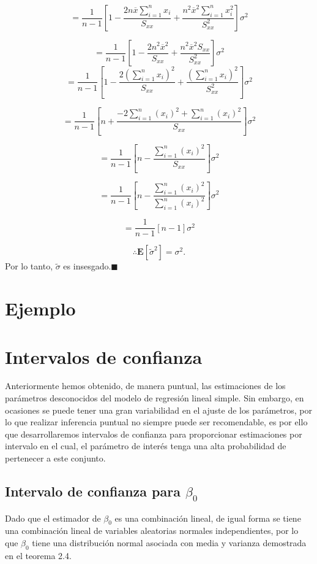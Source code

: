 \documentclass[a4paper,oneside,openany]{book}
\begin{document}
\[=\frac{1}{n-1}\left[ 1-\frac{2n\overline{x}\sum_{i=1}^{n}x_{i}}{S_{xx}}+\frac{n^2\overline{x}^2\sum_{i=1}^{n}x_{i}^2}{S_{xx}^2}\right]\sigma^2\]

\[=\frac{1}{n-1}\left[ 1-\frac{2n^2\overline{x}^2}{S_{xx}}+\frac{n^2\overline{x}^2S_{xx}}{S_{xx}^2}\right]\sigma^2\]
\[=\frac{1}{n-1}\left[ 1-\frac{2(\sum_{i=1 }^{n}x_{i})^2}{S_{xx}}+\frac{(\sum_{i=1}^{n}x_{i})^2}{S_{xx}^2}\right]\sigma^2\]

\[=\frac{1}{n-1}\left[ n+\frac{-2\sum_{i=1 }^{n}(x_{i})^2+\sum_{i=1}^{n}(x_{i})^2}{S_{xx}}\right]\sigma^2\]

\[=\frac{1}{n-1}\left[ n-\frac{\sum_{i=1 }^{n}(x_{i})^2}{S_{xx}}\right]\sigma^2\]

\[=\frac{1}{n-1}\left[ n-\frac{\sum_{i=1 }^{n}(x_{i})^2}{\sum_{i=1 }^{n}(x_{i})^2}\right]\sigma^2\]

\[=\frac{1}{n-1}\left[ n-1\right]\sigma^2\]

\[ \therefore \mathbf{E}[\tilde{\sigma}^2]=\sigma^2.\] Por lo tanto,
\(\tilde{\sigma}\) es insesgado.\(\blacksquare\)

\chapter{Ejemplo}\label{ejemplo-16}

\chapter{Intervalos de confianza}\label{intervalos-de-confianza-1}

Anteriormente hemos obtenido, de manera puntual, las estimaciones de los
parámetros desconocidos del modelo de regresión lineal simple. Sin
embargo, en ocasiones se puede tener una gran variabilidad en el ajuste
de los parámetros, por lo que realizar inferencia puntual no siempre
puede ser recomendable, es por ello que desarrollaremos intervalos de
confianza para proporcionar estimaciones por intervalo en el cual, el
parámetro de interés tenga una alta probabilidad de pertenecer a este
conjunto.

\section{\texorpdfstring{Intervalo de confianza para
\(\beta_{0}\)}{Intervalo de confianza para \textbackslash{}beta\_\{0\}}}\label{intervalo-de-confianza-para-beta_0}

Dado que el estimador de \(\beta_{0}\) es una combinación lineal, de
igual forma se tiene una combinación lineal de variables aleatorias
normales independientes, por lo que \(\beta_{0}\) tiene una distribución
normal asociada con media y varianza demostrada en el teorema 2.4.
\end{document}
